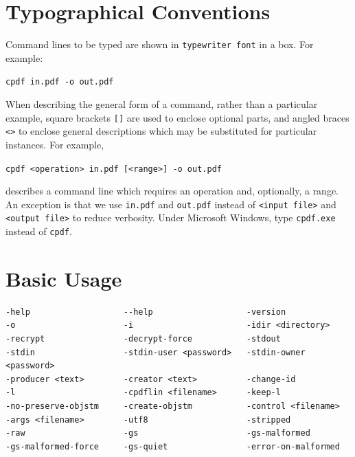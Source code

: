 \documentclass{book}
\begin{document}
\pagestyle{plain}
\tableofcontents\clearpage\pagestyle{empty}

\cleardoublepage
\pagestyle{plain}
\chapter*{Typographical Conventions}
Command lines to be typed are shown in \texttt{typewriter\hspace{-1mm} font} in a box.
For example:
\begin{framed}
\noindent\small\verb!cpdf in.pdf -o out.pdf!
\end{framed}
\noindent When describing the general form of a command, rather than a particular
example, square brackets \verb|[]| are used to enclose optional parts, and
angled braces \verb!<>! to enclose general descriptions which may be
substituted for particular instances. For example,
\begin{framed}
\noindent\small\verb!cpdf <operation> in.pdf [<range>] -o out.pdf!
\end{framed}
\noindent describes a command line which requires an operation and, optionally,
a range. An exception is that we use \texttt{in.pdf} and \texttt{out.pdf}
instead of \texttt{<input file>} and \texttt{<output file>} to reduce
verbosity. Under Microsoft Windows, type \texttt{cpdf.exe} instead of \texttt{cpdf}.
\clearpage\pagestyle{empty}\cleardoublepage
\mainmatter
\pagestyle{fancy}



\chapter{Basic Usage}\label{chap:1}


\label{basicusage}
  \begin{framed}
  \small
  \noindent\begin{verbatim}
-help                   --help                   -version 
-o                      -i                       -idir <directory>
-recrypt                -decrypt-force           -stdout
-stdin                  -stdin-user <password>   -stdin-owner <password>  
-producer <text>        -creator <text>          -change-id
-l                      -cpdflin <filename>      -keep-l
-no-preserve-objstm     -create-objstm           -control <filename>
-args <filename>        -utf8                    -stripped
-raw                    -gs                      -gs-malformed
-gs-malformed-force     -gs-quiet                -error-on-malformed\end{verbatim}\end{framed}
\end{document}

